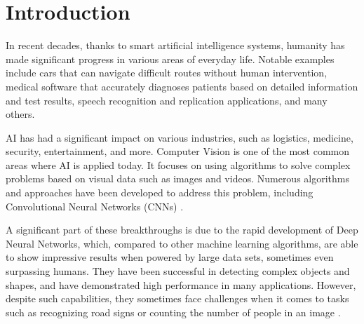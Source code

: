 \documentclass[14pt,a4paper]{extarticle}
\newcounter{e}
\newcounter{tabl}
\numberwithin{equation}{section}
\numberwithin{figure}{section}
\begin{document}

 \newpage
 \thispagestyle{empty}
 \section*{Introduction}
 \begin{center}\end{center}

In recent decades, thanks to smart artificial intelligence systems, humanity has made significant progress in various areas of everyday life. Notable examples include cars that can navigate difficult routes without human intervention, medical software that accurately diagnoses patients based on detailed information and test results, speech recognition and replication applications, and many others.

AI has had a significant impact on various industries, such as logistics, medicine, security, entertainment, and more. Computer Vision is one of the most common areas where AI is applied today. It focuses on using algorithms to solve complex problems based on visual data such as images and videos. Numerous algorithms and approaches have been developed to address this problem, including Convolutional Neural Networks (CNNs) \cite{overview}.

A significant part of these breakthroughs is due to the rapid development of Deep Neural Networks, which, compared to other machine learning algorithms, are able to show impressive results when powered by large data sets, sometimes even surpassing humans. They have been successful in detecting complex objects and shapes, and have demonstrated high performance in many applications. However, despite such capabilities, they sometimes face challenges when it comes to tasks such as recognizing road signs or counting the number of people in an image \cite{od-overview}.
\end{document}
